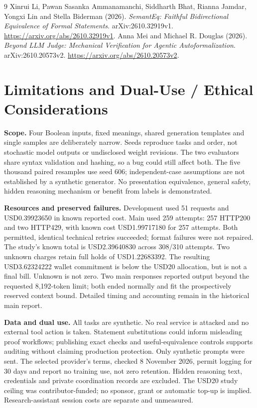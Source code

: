 \documentclass[11pt]{article}
\begin{document}
\clearpage
\begin{thebibliography}{9}
\small
{} Xinrui Li, Pawan Sasanka Ammanamanchi, Siddharth Bhat,
Rianna Jamdar, Yongxi Lin and Stella Biderman (2026).
\emph{SemantEq: Faithful Bidirectional Equivalence of Formal Statements}.
arXiv:2610.32919v1. \url{https://arxiv.org/abs/2610.32919v1}.
 Anna Mei and Michael R. Douglas (2026).
\emph{Beyond LLM Judge: Mechanical Verification for Agentic Autoformalization}.
arXiv:2610.20573v2. \url{https://arxiv.org/abs/2610.20573v2}.
\end{thebibliography}

\appendix
\section{Limitations and Dual-Use / Ethical Considerations}
\textbf{Scope.} Four Boolean inputs, fixed meanings, shared generation templates
and single samples are deliberately narrow. Seeds reproduce tasks and order,
not stochastic model outputs or undisclosed weight revisions. The two evaluators
share syntax validation and hashing, so a bug could still affect both.
The five thousand paired resamples use seed 606; independent-case assumptions
are not established by a synthetic generator. No presentation equivalence,
general safety, hidden reasoning mechanism or benefit from labels is demonstrated.

\textbf{Resources and preserved failures.} Development used 51 requests and
USD0.39923650 in known reported cost. Main used 259 attempts: 257 HTTP200 and
two HTTP429, with known cost USD1.99717180 for 257 attempts. Both permitted,
identical technical retries succeeded; format failures were not repaired.
The study's known total is USD2.39640830 across 308/310 attempts. Two unknown
charges retain full holds of USD1.22683392. The resulting USD3.62324222 wallet
commitment is below the USD20 allocation, but is not a final bill. Unknown is
not zero. Two main responses reported output beyond the requested 8,192-token
limit; both ended normally and fit the prospectively reserved context bound.
Detailed timing and accounting remain in the historical main report.

\textbf{Data and dual use.} All tasks are synthetic. No real service is attacked
and no external tool action is taken. Statement substitutions could inform
misleading proof workflows; publishing exact checks and useful-equivalence
controls supports auditing without claiming production protection. Only synthetic
prompts were sent. The selected provider's terms, checked 8 November 2026,
permit logging for 30 days and report no training use, not zero retention.
Hidden reasoning text, credentials and private coordination records are excluded.
The USD20 study ceiling was contributor-funded; no sponsor, grant or automatic
top-up is implied. Research-assistant session costs are separate and unmeasured.
\end{document}
